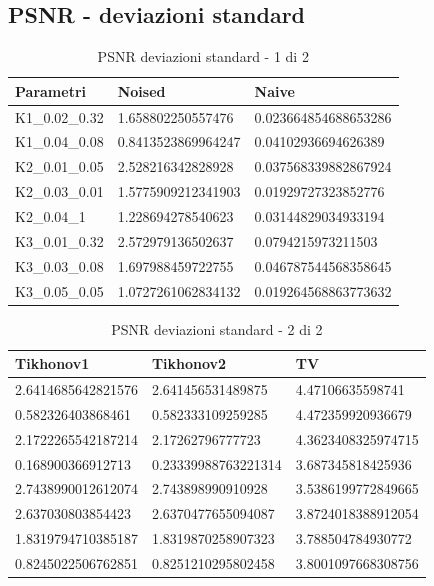 \documentclass[12pt]{article}
\begin{document}
    \subsection{PSNR - deviazioni standard}
    
    \begin{table}[!ht]
    \centering
    \begin{tabular}{|l|l|l|}
    \hline
        Parametri & Noised & Naive \\ \hline
        K1\_0.02\_0.32 & 1.658802250557476 & 0.023664854688653286 \\ \hline
        K1\_0.04\_0.08 & 0.8413523869964247 & 0.04102936694626389 \\ \hline
        K2\_0.01\_0.05 & 2.528216342828928 & 0.037568339882867924 \\ \hline
        K2\_0.03\_0.01 & 1.5775909212341903 & 0.01929727323852776 \\ \hline
        K2\_0.04\_1 & 1.228694278540623 & 0.03144829034933194 \\ \hline
        K3\_0.01\_0.32 & 2.572979136502637 & 0.0794215973211503 \\ \hline
        K3\_0.03\_0.08 & 1.697988459722755 & 0.046787544568358645 \\ \hline
        K3\_0.05\_0.05 & 1.0727261062834132 & 0.019264568863773632 \\ \hline
    \end{tabular}
    \caption{PSNR deviazioni standard - 1 di 2}
    \label{table:8}
    \end{table}
    
    \begin{table}[!ht]
    \centering
    \begin{tabular}{|l|l|l|}
    \hline
        Tikhonov1 & Tikhonov2 & TV \\ \hline
        2.6414685642821576 & 2.641456531489875 & 4.47106635598741 \\ \hline
        0.582326403868461 & 0.582333109259285 & 4.472359920936679 \\ \hline
        2.1722265542187214 & 2.17262796777723 & 4.3623408325974715 \\ \hline
        0.168900366912713 & 0.23339988763221314 & 3.687345818425936 \\ \hline
        2.7438990012612074 & 2.743898990910928 & 3.5386199772849665 \\ \hline
        2.637030803854423 & 2.6370477655094087 & 3.8724018388912054 \\ \hline
        1.8319794710385187 & 1.8319870258907323 & 3.788504784930772 \\ \hline
        0.8245022506762851 & 0.8251210295802458 & 3.8001097668308756 \\ \hline
    \end{tabular}
    \caption{PSNR deviazioni standard - 2 di 2}
    \label{table:9}
    \end{table}
    \newpage
    
\end{document}
